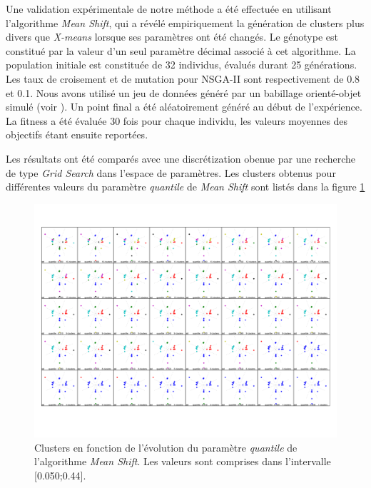 \documentclass{llncs}
\begin{document}
Une validation expérimentale de notre méthode a été effectuée en utilisant l'algorithme \textit{Mean Shift}, qui a révélé empiriquement la génération de clusters plus divers que \textit{X-means} lorsque ses paramètres ont été changés. Le génotype est constitué par la valeur d'un seul paramètre décimal associé à cet algorithme. La population initiale est constituée de 32 individus, évalués durant 25 générations. Les taux de croisement et de mutation pour NSGA-II sont respectivement de 0.8 et 0.1. Nous avons utilisé un jeu de données généré par un babillage orienté-objet simulé (voir ). Un point final a été aléatoirement généré au début de l'expérience. La fitness a été évaluée 30 fois pour chaque individu, les valeurs moyennes des objectifs étant ensuite reportées.

Les résultats ont été comparés avec une discrétization obenue par une recherche de type \textit{Grid Search} dans l'espace de paramètres. Les clusters obtenus pour différentes valeurs du paramètre \textit{quantile} de \textit{Mean Shift} sont listés dans la figure \ref{fig:validation} 

\begin{figure}[ht]
  \begin{center}
  \includegraphics[width=\textwidth]{figures/DS2_MS.pdf}
    \caption{Clusters en fonction de l'évolution du paramètre \textit{quantile} de l'algorithme \textit{Mean Shift}. Les valeurs sont comprises dans l'intervalle [0.050;0.44].}
  \label{fig:validation}
  \end{center}
\end{figure}
\end{document}
